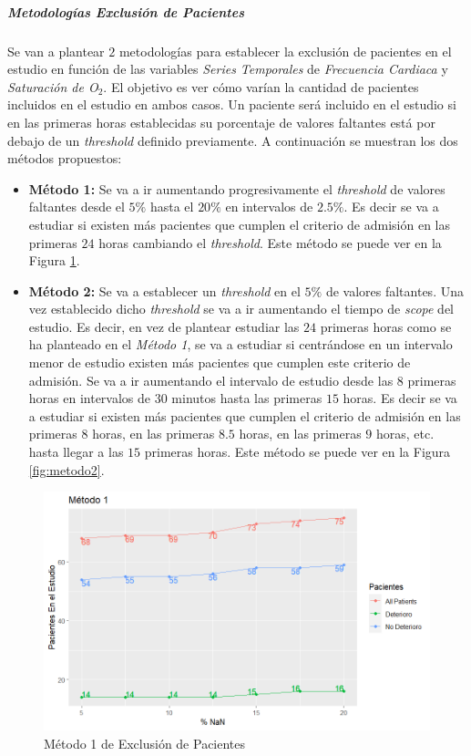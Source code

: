 \newpage

\subparagraph{Metodologías Exclusión de Pacientes}\label{sec:metodologias_exclusion_pacientes}

Se van a plantear $2$ metodologías para establecer la exclusión de pacientes en el estudio en función de las variables \textit{Series Temporales} de \textit{Frecuencia Cardiaca} y \textit{Saturación de O$_2$}. El objetivo es ver cómo varían la cantidad de pacientes incluidos en el estudio en ambos casos. Un paciente será incluido en el estudio si en las primeras horas establecidas su porcentaje de valores faltantes está por debajo de un \textit{threshold} definido previamente. A continuación se muestran los dos métodos propuestos: 

\begin{itemize}
    \item \textbf{Método 1:} Se va a ir aumentando progresivamente el \textit{threshold} de valores faltantes desde el $5 \%$ hasta el $20 \%$ en intervalos de $2.5 \%$.  Es decir se va a estudiar si existen más pacientes que cumplen el criterio de admisión en las primeras $24$ horas cambiando el \textit{threshold}. Este método se puede ver en la Figura \ref{fig:metodo1}.
    \item \textbf{Método 2:} Se va a establecer un \textit{threshold} en el $5 \%$ de valores faltantes. Una vez establecido dicho \textit{threshold} se va a ir aumentando el tiempo de \textit{scope} del estudio. Es decir, en vez de plantear estudiar las $24$ primeras horas como se ha planteado en el \textit{Método 1}, se va a estudiar si centrándose en un intervalo menor de estudio existen más pacientes que cumplen este criterio de admisión. Se va a ir aumentando el intervalo de estudio desde las $8$ primeras horas en intervalos de $30$ minutos hasta las primeras $15$ horas. Es decir se va a estudiar si existen más pacientes que cumplen el criterio de admisión en las primeras $8$ horas, en las primeras $8.5$ horas, en las primeras $9$ horas, etc. hasta llegar a las $15$ primeras horas. Este método se puede ver en la Figura \ref{fig:metodo2}.
\end{itemize}

\begin{figure}[H]
    \centering
    \includegraphics[scale = 1]{./img/metodo1.png}
    \caption{Método 1 de Exclusión de Pacientes}
    \label{fig:metodo1}
\end{figure}

